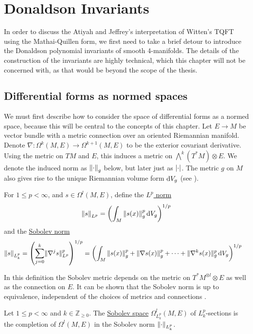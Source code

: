 
\chapter{Donaldson Invariants}
\label{chapter_donaldson}
In order to discuss the Atiyah and Jeffrey's interpretation of Witten's TQFT
using the Mathai-Quillen form, we first need to take a brief detour to introduce
the Donaldson polynomial invariants of smooth 4-manifolds. 
The details of the construction of the invariants are highly technical, which
this chapter will not be concerned with, as that would be beyond the scope of 
the thesis. 

\section{Differential forms as normed spaces}
We must first describe how to consider the space of differential forms
as a normed space, because this will be central to the concepts of this chapter.
Let $E\to M$ be vector bundle with a metric connection over an oriented 
Riemannian manifold. 
Denote $\nabla : \Omega^k(M,E) \to \Omega^{k+1}(M,E)$ to be the exterior
covariant derivative. Using the metric on $TM$ and  $E$, this induces a
metric on  $\bigwedge^k(T^*M)\otimes E$. We denote the induced norm as 
$\norm{\cdot}_g$ below, but later just as $\abs{\cdot}$.
The metric $g$ on $M$ also gives rise to the unique Riemannian volume form 
$\odif{V}_g$ (see \cite[Prop 2.41]{riemannian_manifolds}).
\begin{defn}
    For $1 \leq p < \infty$, and $s \in \Omega^l(M,E)$, 
	define the \underline{$L^p$ norm}
	\[
		 \norm{s}_{L^p} = \paren{\int_M \norm{s(x)}^p_g \odif{V}_g}^{1 /p}
	\] 
	and the \underline{Sobolev norm}
	\begin{align*}
		\norm{s}_{L^p_k} 
		&= \paren{\sum_{j=0}^{k} \norm[*]{\nabla^j s}_{L^p}^p }^{1 /p} 
		= \paren{ \int_M \norm{s(x)}^p_g + \norm{\nabla s(x)}^p_g + \cdots
		+ \norm[*]{\nabla^k s(x)}^p_g \odif{V}_g}^{1 /p} 
	\end{align*}
\end{defn}
In this definition the Sobolev metric depends on the metric on $T^*M^{\otimes
l}\otimes E$ as well as the connection on $E$. It can be shown that the Sobolev
norm is up to equivalence, independent of the choices of metrics and connections
\cite[Lemma 11.22]{math_for_physics}.
\begin{defn}
	Let $1\leq p < \infty$ and  $k\in \mathbb{Z}_{\geq 0}$. The
	\underline{Sobolev
	space} $\Omega^l_{L^p_k}(M,E)$ of $L^p_k$-sections is the completion of
	$\Omega^l(M,E)$ in the Sobolev norm  $\norm{\cdot}_{L^p_k}$.
\end{defn}

